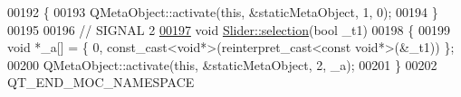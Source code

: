 \begin{DoxyCode}
00192 \{
00193     QMetaObject::activate(\textcolor{keyword}{this}, &staticMetaObject, 1, 0);
00194 \}
00195 
00196 \textcolor{comment}{// SIGNAL 2}
\hypertarget{a00019_source_l00197}{}\hyperlink{a00024_a66bf875d43a16cf37527ab75c439fd8e}{00197} \textcolor{keywordtype}{void} \hyperlink{a00024_a66bf875d43a16cf37527ab75c439fd8e}{Slider::selection}(\textcolor{keywordtype}{bool} \_t1)
00198 \{
00199     \textcolor{keywordtype}{void} *\_a[] = \{ 0, \textcolor{keyword}{const\_cast<}\textcolor{keywordtype}{void}*\textcolor{keyword}{>}(\textcolor{keyword}{reinterpret\_cast<}\textcolor{keyword}{const }\textcolor{keywordtype}{void}*\textcolor{keyword}{>}(&\_t1)) \};
00200     QMetaObject::activate(\textcolor{keyword}{this}, &staticMetaObject, 2, \_a);
00201 \}
00202 QT\_END\_MOC\_NAMESPACE
\end{DoxyCode}
